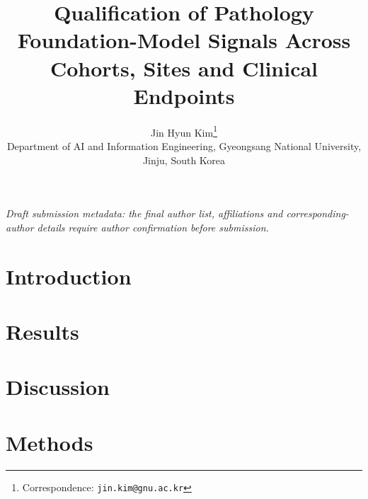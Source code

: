 \documentclass[11pt,a4paper]{article}
\title{Qualification of Pathology Foundation-Model Signals Across Cohorts, Sites and Clinical Endpoints}
\author{Jin Hyun Kim\thanks{Correspondence: \texttt{jin.kim@gnu.ac.kr}} \\
\small Department of AI and Information Engineering, Gyeongsang National University, Jinju, South Korea}
\date{}
\begin{document}
\maketitle
\begin{center}
\small\textit{Draft submission metadata: the final author list, affiliations and
corresponding-author details require author confirmation before submission.}
\end{center}



\section{Introduction}


\section{Results}


\section{Discussion}


\section{Methods}





\end{document}
